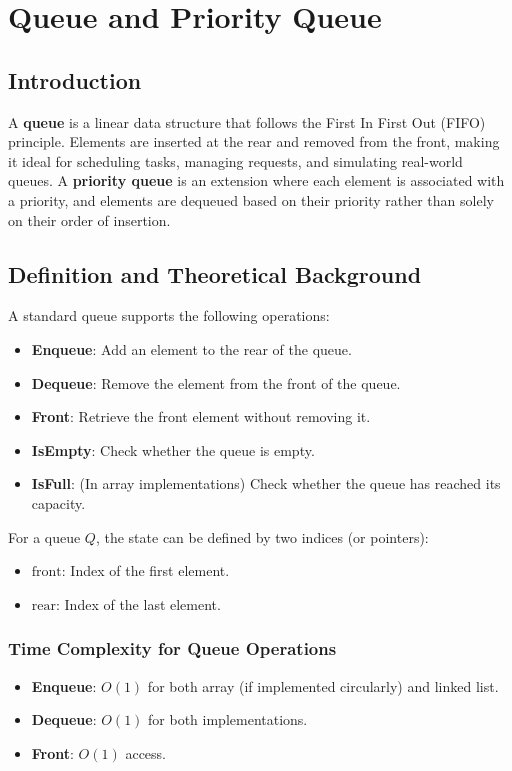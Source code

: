 \chapter{Queue and Priority Queue}

\section{Introduction}
A \textbf{queue} is a linear data structure that follows the First In First Out (FIFO) principle. Elements are inserted at the rear and removed from the front, making it ideal for scheduling tasks, managing requests, and simulating real-world queues. A \textbf{priority queue} is an extension where each element is associated with a priority, and elements are dequeued based on their priority rather than solely on their order of insertion.

\section{Definition and Theoretical Background}
A standard queue supports the following operations:
\begin{itemize}
    \item \textbf{Enqueue}: Add an element to the rear of the queue.
    \item \textbf{Dequeue}: Remove the element from the front of the queue.
    \item \textbf{Front}: Retrieve the front element without removing it.
    \item \textbf{IsEmpty}: Check whether the queue is empty.
    \item \textbf{IsFull}: (In array implementations) Check whether the queue has reached its capacity.
\end{itemize}

For a queue \( Q \), the state can be defined by two indices (or pointers): 
\begin{itemize}
    \item \(\text{front}\): Index of the first element.
    \item \(\text{rear}\): Index of the last element.
\end{itemize}

\subsection{Time Complexity for Queue Operations}
\begin{itemize}
    \item \textbf{Enqueue}: \( O(1) \) for both array (if implemented circularly) and linked list.
    \item \textbf{Dequeue}: \( O(1) \) for both implementations.
    \item \textbf{Front}: \( O(1) \) access.
\end{itemize}

